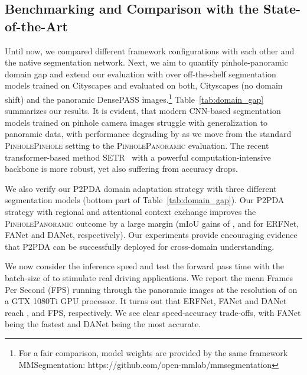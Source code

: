 \documentclass[journal]{IEEEtran}
\begin{document}
\subsection{Benchmarking and Comparison with the State-of-the-Art}
\label{sec:soa}

Until now, we compared different framework configurations with each other and the native segmentation network.
Next, we aim to quantify pinhole-panoramic domain gap and extend our evaluation with over  off-the-shelf segmentation models trained on Cityscapes and evaluated on both, Cityscapes (no domain shift) and the panoramic DensePASS images.\footnote[1]{For a fair comparison, model weights are provided by the same framework MMSegmentation: https://github.com/open-mmlab/mmsegmentation}
Table~\ref{tab:domain_gap} summarizes our results.
It is evident, that modern CNN-based segmentation models trained on pinhole camera images struggle with generalization to  panoramic data, with performance degrading by  as we move from the standard \textsc{PinholePinhole} setting to the \textsc{PinholePanoramic} evaluation. 
The recent transformer-based method SETR~\cite{setr} with a powerful computation-intensive backbone is more robust, yet also suffering from  accuracy drops.

We also verify our P2PDA domain adaptation strategy with three different segmentation models (bottom part of Table~\ref{tab:domain_gap}).
Our P2PDA strategy with regional and attentional context exchange improves the \textsc{PinholePanoramic} outcome by a large margin (mIoU gains of ,  and  for ERFNet, FANet and DANet, respectively).
Our experiments provide encouraging evidence that P2PDA can be successfully deployed for cross-domain  understanding. 

We now consider the inference speed and test the forward pass time with the batch-size of  to stimulate real driving applications. We report the mean Frames Per Second (FPS) running through the  panoramic images at the resolution of  on a GTX 1080Ti GPU processor. It turns out that ERFNet, FANet and DANet reach ,  and  FPS, respectively. We see clear speed-accuracy trade-offs, with FANet being the fastest and DANet being the most accurate.
\end{document}
